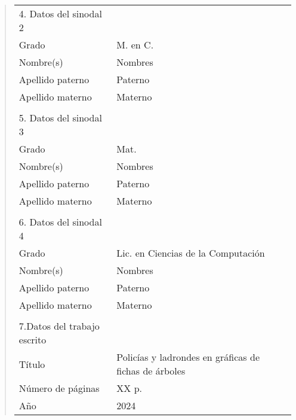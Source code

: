 {\begin{quote}
\begin{tabular}{lll}
4. Datos del sinodal 2      & {}                                          \\
Grado                       & M. en C.                                    \\
Nombre(s)                   & Nombres                                     \\
Apellido paterno            & Paterno                                     \\
Apellido materno            & Materno                                     \\
{}                          & {}                                          \\
5. Datos del sinodal 3      & {}                                          \\
Grado                       & Mat.                                        \\
Nombre(s)                   & Nombres                                     \\
Apellido paterno            & Paterno                                     \\
Apellido materno            & Materno                                     \\
{}                          & {}                                          \\
6. Datos del sinodal 4      & {}                                          \\
Grado                       & Lic. en Ciencias de la Computaci\'on        \\
Nombre(s)                   & Nombres                                     \\
Apellido paterno            & Paterno                                     \\
Apellido materno            & Materno                                     \\
{}                          & {}                                          \\
7.Datos del trabajo escrito & {}                                          \\
T\'itulo                    & Policías y ladrondes en gráficas de fichas de árboles                                  \\
N\'umero de p\'aginas       & XX p.                                       \\
A\~no                       & 2024                                        \\
\end{tabular}
\end{quote}
}
